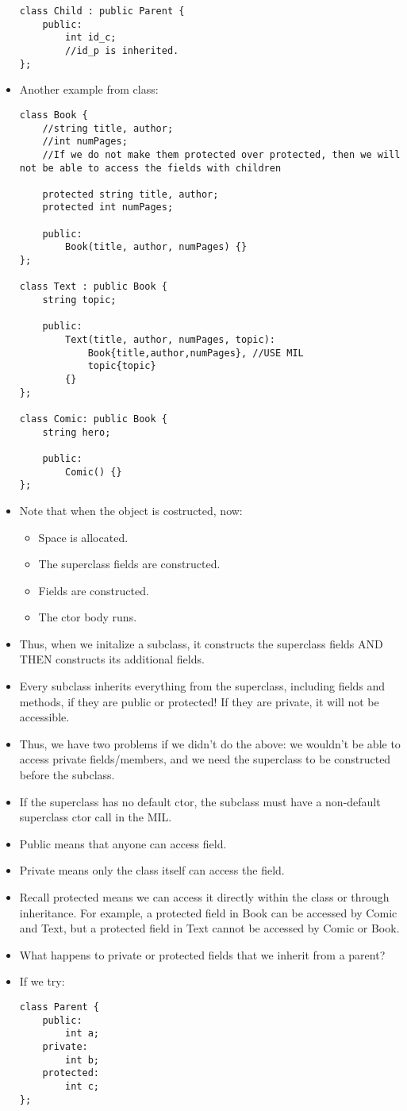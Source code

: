 \documentclass{article}
\begin{document}
\begin{itemize}
\begin{lstlisting}
class Child : public Parent {
    public:
        int id_c;
        //id_p is inherited.
};
\end{lstlisting}
\item Another example from class:
\begin{lstlisting}
class Book {
    //string title, author;
    //int numPages;
    //If we do not make them protected over protected, then we will not be able to access the fields with children

    protected string title, author;
    protected int numPages;
    
    public:
        Book(title, author, numPages) {}
};

class Text : public Book {
    string topic;

    public:
        Text(title, author, numPages, topic): 
            Book{title,author,numPages}, //USE MIL
            topic{topic}
        {}
};

class Comic: public Book {
    string hero;

    public:
        Comic() {}
};
\end{lstlisting}
\item Note that when the object is costructed, now:
\begin{itemize}
\item Space is allocated.
\item The superclass fields are constructed.
\item Fields are constructed.
\item The ctor body runs.
\end{itemize}
\item Thus, when we initalize a subclass, it constructs the superclass fields AND THEN constructs its additional fields.
\item Every subclass inherits everything from the superclass, including fields and methods, if they are public or protected!  If they are private, it will not be accessible.
\item Thus, we have two problems if we didn't do the above: we wouldn't be able to access private fields/members, and we need the superclass to be constructed before the subclass.
\item If the superclass has no default ctor, the subclass must have a non-default superclass ctor call in the MIL.
\item Public means that anyone can access field.
\item Private means only the class itself can access the field.
\item Recall protected means we can access it directly within the class or through inheritance.  For example, a protected field in Book can be accessed by Comic and Text, but a protected field in Text cannot be accessed by Comic or Book.
\item What happens to private or protected fields that we inherit from a parent?
\item If we try:
\begin{lstlisting}
class Parent {
    public:
        int a;
    private: 
        int b;
    protected:
        int c;
};


\end{lstlisting}
\end{itemize}
\end{document}
